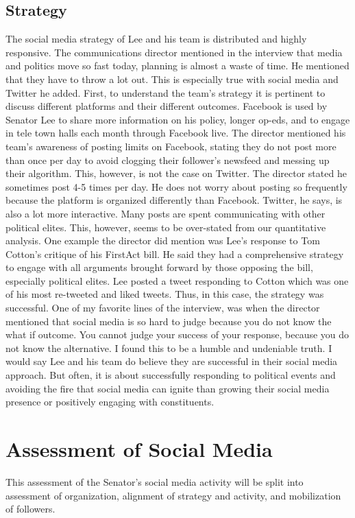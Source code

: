 \documentclass{article}
\begin{document}
\subsection{Strategy}
\begin{flushleft}
The social media strategy of Lee and his team is distributed and highly responsive. The communications director mentioned in the interview that media and politics move so fast today, planning is almost a waste of time. He mentioned that they have to throw a lot out. This is especially true with social media and Twitter he added. First, to understand the team's strategy it is pertinent to discuss different platforms and their different outcomes. Facebook is used by Senator Lee to share more information on his policy, longer op-eds, and to engage in tele town halls each month through Facebook live. The director mentioned his team's awareness of posting limits on Facebook, stating they do not post more than once per day to avoid clogging their follower's newsfeed and messing up their algorithm. This, however, is not the case on Twitter. The director stated he sometimes post 4-5 times per day. He does not worry about posting so frequently because the platform is organized differently than Facebook. Twitter, he says, is also a lot more interactive. Many posts are spent communicating with other political elites. This, however, seems to be over-stated from our quantitative analysis. One example the director did mention was Lee's response to Tom Cotton's critique of his FirstAct bill. He said they had a comprehensive strategy to engage with all arguments brought forward by those opposing the bill, especially political elites. Lee posted a tweet responding to Cotton which was one of his most re-tweeted and liked tweets. Thus, in this case, the strategy was successful. One of my favorite lines of the interview, was when the director mentioned that social media is so hard to judge because you do not know the what if outcome. You cannot judge your success of your response, because you do not know the alternative. I found this to be a humble and undeniable truth. I would say Lee and his team do believe they are successful in their social media approach. But often, it is about successfully responding to political events and avoiding the fire that social media can ignite than growing their social media presence or positively engaging with constituents. 
\end{flushleft}

\section{Assessment of Social Media}
\begin{flushleft}
This assessment of the Senator's social media activity will be split into assessment of organization, alignment of strategy and activity, and mobilization of followers. 
\end{flushleft}
\end{document}
